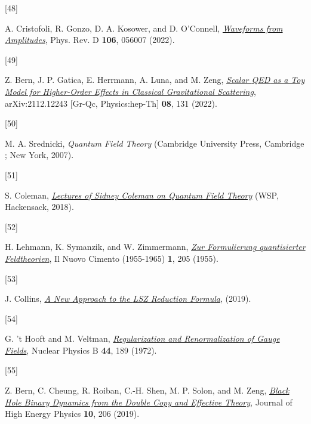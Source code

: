 \documentclass[
  10pt,
  a4paper,
  DIV=11,
  numbers=noendperiod,
  twoside]{scrreprt}
\newlength{\cslhangindent}
\newlength{\csllabelwidth}
\newlength{\cslentryspacingunit} %
\newenvironment{CSLReferences}[2] %
 {%
  \setlength{\parindent}{0pt}
  \ifodd #1
  \let\oldpar\par
  \def\par{\hangindent=\cslhangindent\oldpar}
  \fi
  \setlength{\parskip}{#2\cslentryspacingunit}
 }%
 {}
\newcommand{\CSLLeftMargin}[1]{\parbox[t]{\csllabelwidth}{#1}}
\newcommand{\CSLRightInline}[1]{\parbox[t]{\linewidth - \csllabelwidth}{#1}\break}
\DeclareRobustCommand{\[}{\begin{equation}}
\DeclareRobustCommand{\]}{\end{equation}}
\begin{document}
\begin{CSLReferences}{0}{0}
\leavevmode{}%
\CSLLeftMargin{{[}48{]} }%
\CSLRightInline{A. Cristofoli, R. Gonzo, D. A. Kosower, and D.
O'Connell,
\emph{\href{https://doi.org/10.1103/PhysRevD.106.056007}{Waveforms from
Amplitudes}}, Phys. Rev. D \textbf{106}, 056007 (2022).}

\leavevmode{}%
\CSLLeftMargin{{[}49{]} }%
\CSLRightInline{Z. Bern, J. P. Gatica, E. Herrmann, A. Luna, and M.
Zeng, \emph{\href{https://doi.org/10.1007/JHEP08(2022)131}{Scalar {QED}
as a Toy Model for Higher-Order Effects in Classical Gravitational
Scattering}}, arXiv:2112.12243 {[}Gr-Qc, Physics:hep-Th{]} \textbf{08},
131 (2022).}

\leavevmode{}%
\CSLLeftMargin{{[}50{]} }%
\CSLRightInline{M. A. Srednicki, \emph{Quantum Field Theory} ({Cambridge
University Press}, {Cambridge ; New York}, 2007).}

\leavevmode{}%
\CSLLeftMargin{{[}51{]} }%
\CSLRightInline{S. Coleman,
\emph{\href{https://doi.org/10.1142/9371}{Lectures of {Sidney Coleman}
on {Quantum Field Theory}}} ({WSP}, {Hackensack}, 2018).}

\leavevmode{}%
\CSLLeftMargin{{[}52{]} }%
\CSLRightInline{H. Lehmann, K. Symanzik, and W. Zimmermann,
\emph{\href{https://doi.org/10.1007/BF02731765}{{Zur Formulierung
quantisierter Feldtheorien}}}, Il Nuovo Cimento (1955-1965) \textbf{1},
205 (1955).}

\leavevmode{}%
\CSLLeftMargin{{[}53{]} }%
\CSLRightInline{J. Collins,
\emph{\href{https://arxiv.org/abs/1904.10923}{A New Approach to the
{LSZ} Reduction Formula}}, (2019).}

\leavevmode{}%
\CSLLeftMargin{{[}54{]} }%
\CSLRightInline{G. 't Hooft and M. Veltman,
\emph{\href{https://doi.org/10.1016/0550-3213(72)90279-9}{Regularization
and Renormalization of Gauge Fields}}, Nuclear Physics B \textbf{44},
189 (1972).}

\leavevmode{}%
\CSLLeftMargin{{[}55{]} }%
\CSLRightInline{Z. Bern, C. Cheung, R. Roiban, C.-H. Shen, M. P. Solon,
and M. Zeng, \emph{\href{https://doi.org/10.1007/JHEP10(2019)206}{Black
Hole Binary Dynamics from the Double Copy and Effective Theory}},
Journal of High Energy Physics \textbf{10}, 206 (2019).}


\end{CSLReferences}
\end{document}
